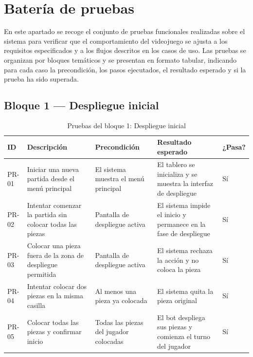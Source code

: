 \section{Batería de pruebas}

En este apartado se recoge el conjunto de pruebas funcionales realizadas sobre el sistema para verificar que el comportamiento del videojuego se ajusta a los requisitos especificados y a los flujos descritos en los casos de uso. Las pruebas se organizan por bloques temáticos y se presentan en formato tabular, indicando para cada caso la precondición, los pasos ejecutados, el resultado esperado y si la prueba ha sido superada.

\subsection{Bloque 1 — Despliegue inicial}

\begin{table}[H]
	\centering
	\small
	\begin{tabular}{|>{\centering\arraybackslash}p{1cm}|>{\centering\arraybackslash}p{4cm}|>{\centering\arraybackslash}p{4cm}|>{\centering\arraybackslash}p{4cm}|>{\centering\arraybackslash}p{1.5cm}|}
		\hline
		\textbf{ID} & \textbf{Descripción} & \textbf{Precondición} & \textbf{Resultado esperado} & \textbf{¿Pasa?} \\
		\hline
		PR-01 & Iniciar una nueva partida desde el menú principal & El sistema muestra el menú principal & El tablero se inicializa y se muestra la interfaz de despliegue & \cellcolor{green!40}Sí \\
		\hline
		PR-02 & Intentar comenzar la partida sin colocar todas las piezas & Pantalla de despliegue activa & El sistema impide el inicio y permanece en la fase de despliegue & \cellcolor{green!40}Sí \\
		\hline
		PR-03 & Colocar una pieza fuera de la zona de despliegue permitida & Pantalla de despliegue activa & El sistema rechaza la acción y no coloca la pieza & \cellcolor{green!40}Sí \\
		\hline
		PR-04 & Intentar colocar dos piezas en la misma casilla & Al menos una pieza ya colocada & El sistema quita la pieza original & \cellcolor{green!40}Sí \\
		\hline
		PR-05 & Colocar todas las piezas y confirmar inicio & Todas las piezas del jugador colocadas & El bot despliega sus piezas y comienza el turno del jugador & \cellcolor{green!40}Sí \\
		\hline
	\end{tabular}
	\caption{Pruebas del bloque 1: Despliegue inicial}
\end{table}

